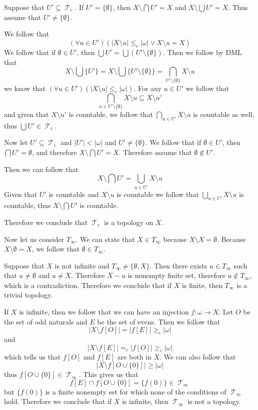 \documentclass[11pt,oneside,titlepage]{book}
\DeclareMathOperator \topol {\mathcal {T}}
\begin{document}
Suppose that $U' \subseteq \topol_c$. If $U' = \{\emptyset\}$, then $
X \setminus \bigcap{U'} = X$ and $X \setminus \bigcup{U'} = X$.
Thus assume that $U' \neq \{\emptyset\}$.

We follow that
$$(\forall u \in U')(|X \setminus u| \leq_c |\omega| \lor X \setminus u = X)$$
We follow that if $\emptyset \in U'$, then $\bigcup{U'} = \bigcup{(U' \setminus \{\emptyset\})}$.
Then we follow by DML that
$$X \setminus \bigcup\{U'\} = X \setminus \bigcup\{U' \setminus \{\emptyset\}\} =
\bigcap_{U' \setminus \{\emptyset\}}{X \setminus u}$$
we know that $(\forall u \in U')(|X \setminus u| \leq_c |\omega|)$. For any $u \in U'$ we
follow that
$$\bigcap_{u \in U' \setminus \{\emptyset\}}{X \setminus u} \subseteq X \setminus u'$$
and given that $X \setminus u'$ is countable, we follow that $\bigcap_{u \in U'}{X \setminus u}$
is countable as well, thus $\bigcup{U'} \in \topol_c$.

Now let $U' \subseteq \topol_c$ and $|U'| < |\omega|$ and $U' \neq \{\emptyset\}$.
We follow that if $\emptyset \in U'$, then $\bigcap{U'} = \emptyset$, and therefore
$X \setminus \bigcap{U'} = X$. Therefore assume that $\emptyset \notin U'$.

Then we can follow that
$$X \setminus \bigcap{U'} = \bigcup_{u \in U'}{X \setminus u}$$
Given that $U'$ is countable and $X \setminus u$ is countable we follow that
$\bigcup_{u \in U'}{X \setminus u}$ is countable, thus $X \setminus \bigcap{U'}$ is countable.

Therefore we conclude that $\topol_c$ is a topology on $X$.

Now let us consider $T_\infty$. We can state that $X \in T_\infty$ because
$X \setminus X = \emptyset$. Because $X \setminus \emptyset = X$, we follow that
$\emptyset \in T_\infty$.

Suppose that $X$ is not infinite and $T_\infty \neq \{\emptyset, X\}$. Then there exists
$u \in T_\infty$ such that $u \neq \emptyset$ and $u \neq X$. Therefore $X - u$ is
nonempty finite set, therefore $u \notin T_\infty$, which is a contradiction.
Therefore we conclude that if $X$ is finite, then $T_\infty$ is a trivial topology.

If $X$ is infinite, then we follow that we can have an injection $f: \omega \to X$.
Let $O$ be the set of odd naturals and $E$ be the set of evens. Then we follow that
$$|X \setminus f[O]| = |f[E]| \geq_c |\omega|$$
and
$$|X \setminus f[E]| =_c |f[O]| \geq_c |\omega|$$
which tells us that $f[O]$ and $f[E]$ are both in $X$. We can also follow that
$$|X \setminus f[O \cup \{0\}]| \geq |\omega|$$
thus $ f[O \cup \{0\}] \in \topol_\infty$. This gives us that
$$f[E] \cap f[O \cup \{0\}] = \{f(0)\} \in \topol_\infty$$
but $\{f(0)\}$ is a finite nonempty set for which none of the conditions of $\topol_\infty$
hold. Therefore we conclude that if $X$ is infinite, then $\topol_\infty$ is not a topology.
\end{document}
